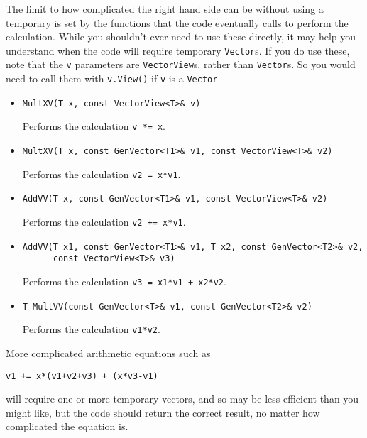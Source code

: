 \documentclass[twoside,letterpaper,11pt]{article}
\renewcommand{\tt}[1]{{\texttt {#1}}}
\begin{document}
The limit to how complicated the right hand side can be without using a 
temporary is set by the 
functions that the code eventually calls to perform the calculation.  
While you shouldn't ever
need to use these directly, it may help you understand when the code will require 
temporary \tt{Vector}s.  If you do use these, note that the \tt{v} parameters
are \tt{VectorView}s, rather than \tt{Vector}s.  So you would need to 
call them with \tt{v.View()} if \tt{v} is a \tt{Vector}.

\begin{itemize}

\item
\begin{verbatim}
MultXV(T x, const VectorView<T>& v)
\end{verbatim}
Performs the calculation \tt{v *= x}.

\item
\begin{verbatim}
MultXV(T x, const GenVector<T1>& v1, const VectorView<T>& v2)
\end{verbatim}
Performs the calculation \tt{v2 = x*v1}.

\item
\begin{verbatim}
AddVV(T x, const GenVector<T1>& v1, const VectorView<T>& v2)
\end{verbatim}
Performs the calculation \tt{v2 += x*v1}.

\item
\begin{verbatim}
AddVV(T x1, const GenVector<T1>& v1, T x2, const GenVector<T2>& v2,
      const VectorView<T>& v3)
\end{verbatim}
Performs the calculation \tt{v3 = x1*v1 + x2*v2}.

\item
\begin{verbatim}
T MultVV(const GenVector<T>& v1, const GenVector<T2>& v2)
\end{verbatim}
Performs the calculation \tt{v1*v2}.

\end{itemize}

More complicated arithmetic equations such as
\begin{verbatim}
v1 += x*(v1+v2+v3) + (x*v3-v1) 
\end{verbatim}
will require one or more temporary vectors, and so may be less efficient than 
you might like, but the code should return the correct result, no matter
how complicated the equation is.
\end{document}
